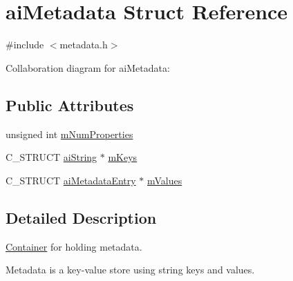\hypertarget{structai_metadata}{\section{ai\+Metadata Struct Reference}
\label{structai_metadata}
}


{\ttfamily \#include $<$metadata.\+h$>$}



Collaboration diagram for ai\+Metadata\+:
\subsection*{Public Attributes}
\begin{DoxyCompactItemize}
\item 
unsigned int \hyperlink{structai_metadata_a32c4587c53dd402a5878ffc94088e528}{m\+Num\+Properties}
\item 
C\+\_\+\+S\+T\+R\+U\+C\+T \hyperlink{structai_string}{ai\+String} $\ast$ \hyperlink{structai_metadata_aa8c77a263443658737ee51a74e3c292e}{m\+Keys}
\item 
C\+\_\+\+S\+T\+R\+U\+C\+T \hyperlink{structai_metadata_entry}{ai\+Metadata\+Entry} $\ast$ \hyperlink{structai_metadata_a34b515fcb5b806c471d3c6ce7bc76beb}{m\+Values}
\end{DoxyCompactItemize}


\subsection{Detailed Description}
\hyperlink{class_container}{Container} for holding metadata.

Metadata is a key-\/value store using string keys and values. 

